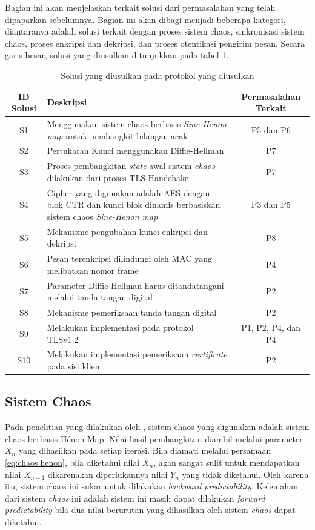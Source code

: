 Bagian ini akan menjelaskan terkait solusi dari permasalahan yang telah dipaparkan sebelumnya. Bagian ini akan dibagi menjadi beberapa kategori, diantaranya adalah solusi terkait dengan proses sistem chaos, sinkronisasi sistem chaos, proses enkripsi dan dekripsi, dan proses otentikasi pengirim pesan. Secara garis besar, solusi yang diusulkan ditunjukkan pada tabel \ref{tab:solusi}.

\begin{table}[!h]
  \centering
  \caption{Solusi yang diusulkan pada protokol yang diusulkan} \label{tab:solusi}
  \begin{tabular}{|c|p{6cm}|c|}
    \hline
    \textbf{ID Solusi} & \textbf{Deskripsi} & \textbf{Permasalahan Terkait} \\
    \hline
    S1 & Menggunakan sistem chaos berbasis \emph{Sine-Henon map} untuk pembangkit bilangan acak & P5 dan P6 \\ \hline
    S2 & Pertukaran Kunci menggunakan Diffie-Hellman & P7 \\ \hline
    S3 & Proses pembangkitan \emph{state} awal sistem \emph{chaos} dilakukan dari proses TLS Handshake & P7 \\ \hline
    S4 & Cipher yang digunakan adalah AES dengan blok CTR dan kunci blok dinamis berbasiskan sistem chaos \emph{Sine-Henon map} & P3 dan P5 \\ \hline
    S5 & Mekanisme pengubahan kunci enkripsi dan dekripsi & P8 \\ \hline
    S6 & Pesan terenkripsi dilindungi oleh MAC yang melibatkan nomor frame & P4 \\ \hline
    S7 & Parameter Diffie-Hellman harus ditandatangani melalui tanda tangan digital & P2 \\ \hline
    S8 & Mekanisme pemeriksaan tanda tangan digital & P2 \\ \hline
    S9 & Melakukan implementasi pada protokol TLSv1.2 & P1, P2, P4, dan P4 \\ \hline
    S10 & Melakukan implementasi pemeriksaan \emph{certificate} pada sisi klien & P2 \\ \hline
  \end{tabular}
\end{table}

\subsection{Sistem Chaos}

Pada penelitian yang dilakukan oleh \textcite{lin2021}, sistem chaos yang digunakan adalah sistem chaos berbasis Hénon Map. Nilai hasil pembangkitan diambil melalui parameter $X_n$ yang dihasilkan pada setiap iterasi. Bila diamati melalui persamaan \ref{eq:chaos.henon}, bila diketahui nilai $X_n$, akan sangat sulit untuk mendapatkan nilai $X_{n-1}$ dikarenakan diperlukannya nilai $Y_n$ yang tidak diketahui. Oleh karena itu, sistem chaos ini sukar untuk dilakukan \emph{backward predictability}. Kelemahan dari sistem \emph{chaos} ini adalah sistem ini masih dapat dilakukan \emph{forward predictability} bila dua nilai berurutan yang dihasilkan oleh sistem \emph{chaos} dapat diketahui. 


